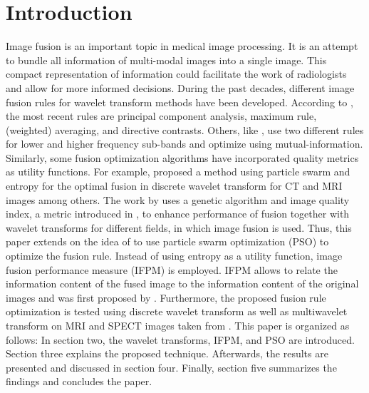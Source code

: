 \documentclass{article}
\begin{document}
\section{Introduction}
\label{sec:intro}
Image fusion is an important topic in medical image processing. It is an attempt to bundle all information of multi-modal images into a single image. This compact representation of information could facilitate the work of radiologists and allow for more informed decisions.  
During the past decades, different image fusion rules for wavelet transform methods have been developed. According to \cite{S.Polinati.2019}, the most recent rules are principal component analysis, maximum rule, (weighted) averaging, and directive contrasts.
Others, like \cite{Wang2004}, use two different rules for lower and higher frequency sub-bands and optimize using mutual-information.
Similarly, some fusion optimization algorithms have incorporated quality metrics as utility functions. For example, \cite{Ravichandran.2017} proposed a method using particle swarm and entropy for the optimal fusion in discrete wavelet transform for CT and MRI images among others. The work by \cite{Dou.2019} uses a genetic algorithm and image quality index, a metric introduced in \cite{ZhouWang.2002}, to enhance performance of fusion together with wavelet transforms for different fields, in which image fusion is used. 
Thus, this paper extends on the idea of \cite{Ravichandran.2017} to use particle swarm optimization (PSO) to optimize the fusion rule.
Instead of using entropy as a utility function, image fusion performance measure (IFPM) is employed. IFPM allows to relate the information content of the fused image to the information content of the original images and was first proposed by \cite{ifpm}. Furthermore, the proposed fusion rule optimization is tested using discrete wavelet transform as well as multiwavelet transform on MRI and SPECT images taken from \cite{HarvardBrain}.
This paper is organized as follows: In section two, the wavelet transforms, IFPM, and PSO are introduced. Section three explains the proposed technique. Afterwards, the results are presented and discussed in section four. Finally, section five summarizes the findings and concludes the paper.
\end{document}
